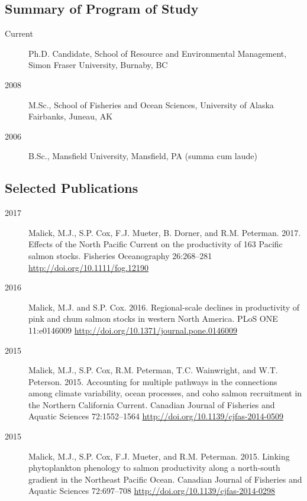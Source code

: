 \documentclass[11pt]{report}
\begin{document}
\subsection*{Summary of Program of Study}
\begin{description}
  \item[Current] Ph.D. Candidate, School of Resource and Environmental
    Management, Simon Fraser University, Burnaby, BC

  \item[2008] M.Sc., School of Fisheries and Ocean Sciences, University of Alaska
    Fairbanks, Juneau, AK

  \item[2006] B.Sc., Mansfield University, Mansfield, PA (summa cum laude)
\end{description}


\subsection*{Selected Publications}
\begin{description}
  \item[2017] Malick, M.J., S.P. Cox, F.J. Mueter, B. Dorner, and R.M. Peterman.
    2017. Effects of the North Pacific Current on the productivity of 163
    Pacific salmon stocks. Fisheries Oceanography 26:268--281
    \url{http://doi.org/10.1111/fog.12190}

  \item[2016] Malick, M.J. and S.P. Cox. 2016. Regional-scale declines in
    productivity of pink and chum salmon stocks in western North America. PLoS
    ONE 11:e0146009 \url{http://doi.org/10.1371/journal.pone.0146009}

  \item[2015] Malick, M.J., S.P. Cox, R.M. Peterman, T.C. Wainwright, and W.T.
    Peterson. 2015. Accounting for multiple pathways in the connections among
    climate variability, ocean processes, and coho salmon recruitment in the
    Northern California Current. Canadian Journal of Fisheries and Aquatic
    Sciences 72:1552--1564 \url{http://doi.org/10.1139/cjfas-2014-0509}

  \item[2015] Malick, M.J., S.P. Cox, F.J. Mueter, and R.M. Peterman. 2015.
    Linking phytoplankton phenology to salmon productivity along a north-south
    gradient in the Northeast Pacific Ocean. Canadian Journal of Fisheries and
    Aquatic Sciences 72:697--708 \url{http://doi.org/10.1139/cjfas-2014-0298}

\end{description}
\end{document}
